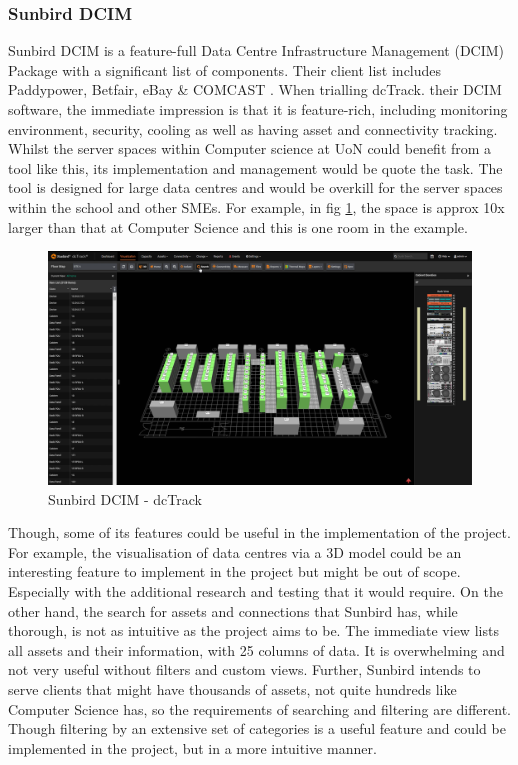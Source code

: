 \documentclass [11pt,a4paper]{article}
\begin{document}
\subsubsection{Sunbird DCIM}
\label{sec:sunbird}
Sunbird DCIM is a feature-full Data Centre Infrastructure Management (DCIM) Package with a significant list of components. Their client list includes Paddypower, Betfair, eBay \& COMCAST \cite{Sunbird-we-know-data-centres}. When trialling dcTrack. their DCIM software, the immediate impression is that it is feature-rich, including monitoring environment, security, cooling as well as having asset and connectivity tracking. Whilst the server spaces within Computer science at UoN could benefit from a tool like this, its implementation and management would be quote the task. The tool is designed for large data centres and would be overkill for the server spaces within the school and other SMEs. For example, in fig \ref{fig:sunbird_dcTrack}, the space is approx 10x larger than that at Computer Science and this is one room in the example. 

\begin{figure}[H]
    \centering
    \includegraphics[width=0.8\linewidth]{images/sunbirddcim.png}
    \caption{Sunbird DCIM - dcTrack}
    \label{fig:sunbird_dcTrack}
\end{figure}

Though, some of its features could be useful in the implementation of the project. For example, the visualisation of data centres via a 3D model could be an interesting feature to implement in the project but might be out of scope. Especially with the additional research and testing that it would require. On the other hand, the search for assets and connections that Sunbird has, while thorough, is not as intuitive as the project aims to be. The immediate view lists all assets and their information, with 25 columns of data. It is overwhelming and not very useful without filters and custom views. Further, Sunbird intends to serve clients that might have thousands of assets, not quite hundreds like Computer Science has, so the requirements of searching and filtering are different. Though filtering by an extensive set of categories is a useful feature and could be implemented in the project, but in a more intuitive manner. 
\end{document}
